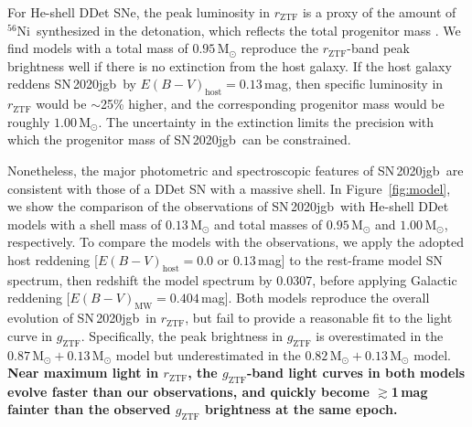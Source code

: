 \documentclass[twocolumn]{aastex631}
\newcommand{\sn}{SN\,2020jgb}
\newcommand{\Ni}{$^{56}\mathrm{Ni}$}
\newcommand{\Msun}{\mathrm{M_\odot}}
\newcommand{\revise}[1]{\textbf{#1}}
\begin{document}
For He-shell DDet SNe, the peak luminosity in $r_\mathrm{ZTF}$ is a proxy of the amount of \Ni\ synthesized in the detonation, which reflects the total progenitor mass \citep[C/O core $+$ He-shell;][]{polin_observational_2019}. We find models with a total mass of $0.95\,\Msun$ reproduce the $r_\mathrm{ZTF}$-band peak brightness well if there is no extinction from the host galaxy. If the host galaxy reddens \sn\ by $E(B-V)_\mathrm{host}=0.13$\,mag, then specific luminosity in $r_\mathrm{ZTF}$ would be $\sim$25\% higher, and the corresponding progenitor mass would be roughly $1.00\,\Msun$. The uncertainty in the extinction limits the precision with which the progenitor mass of \sn\ can be constrained.

Nonetheless, the major photometric and spectroscopic features of \sn\ are consistent with those of a DDet SN with a massive shell. In Figure~\ref{fig:model}, we show the comparison of the observations of \sn\ with He-shell DDet models with a shell mass of $0.13\,\Msun$ and total masses of $0.95\,\Msun$ and $1.00\,\Msun$, respectively. To compare the models with the observations, we apply the adopted host reddening [$E(B-V)_\mathrm{host} = 0.0$ or $0.13$\,mag] to the rest-frame model SN spectrum, then redshift the model spectrum by 0.0307, before applying Galactic reddening [$E(B-V)_\mathrm{MW}=0.404$\,mag]. Both models reproduce the overall evolution of \sn\ in $r_\mathrm{ZTF}$, but fail to provide a reasonable fit to the light curve in $g_\mathrm{ZTF}$. Specifically, the peak brightness in $g_\mathrm{ZTF}$ is overestimated in the $0.87\,\Msun+0.13\,\Msun$ model but underestimated in the $0.82\,\Msun+0.13\,\Msun$ model. \revise{Near maximum light in $r_\mathrm{ZTF}$, the $g_\mathrm{ZTF}$-band light curves in both models evolve faster than our observations, and quickly become $\gtrsim$1\,mag fainter than the observed $g_\mathrm{ZTF}$ brightness at the same epoch.} %
\end{document}
